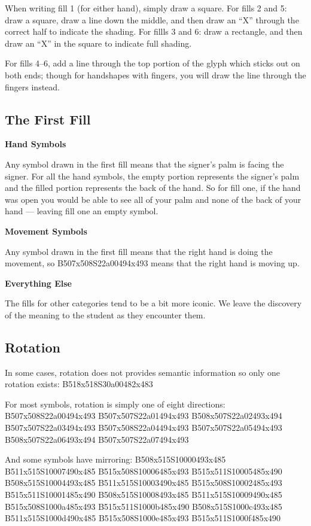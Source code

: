 \documentclass{article}
\begin{document}
When writing fill 1 (for either hand), simply draw a square.
For fills 2 and 5: draw a square, draw a line down the middle, and then draw an ``X'' through the correct half to indicate the shading.
For fillls 3 and 6: draw a rectangle, and then draw an ``X'' in the square to indicate full shading.

For fills 4--6, add a line through the top portion of the glyph which sticks out on both ends;
though for handshapes with fingers, you will draw the line through the fingers instead.

\subsection{The First Fill}

\noindent
\textbf{Hand Symbols}

Any symbol drawn in the first fill means that the signer's palm is facing the signer.
For all the hand symbols, the empty portion represents the signer's palm and the filled portion represents the back of the hand.
So for fill one, if the hand was open you would be able to see all of your palm and none of the back of your hand --- leaving fill one an empty symbol.

\noindent
\textbf{Movement Symbols}

Any symbol drawn in the first fill means that the right hand is doing the movement, so B507x508S22a00494x493 means that the right hand is moving up.

\noindent
\textbf{Everything Else}

The fills for other categories tend to be a bit more iconic.
We leave the discovery of the meaning to the student as they encounter them.

\subsection{Rotation}

In some cases, rotation does not provides semantic information so only one rotation exists:
B518x518S30a00482x483

For most symbols, rotation is simply one of eight directions:
B507x508S22a00494x493 B507x507S22a01494x493 B508x507S22a02493x494 B507x507S22a03494x493 B507x508S22a04494x493 B507x507S22a05494x493 B508x507S22a06493x494 B507x507S22a07494x493

And some symbols have mirroring:
B508x515S10000493x485 B511x515S10007490x485 B515x508S10006485x493 B515x511S10005485x490 B508x515S10004493x485 B511x515S10003490x485 B515x508S10002485x493 B515x511S10001485x490
B508x515S10008493x485 B511x515S10009490x485 B515x508S1000a485x493 B515x511S1000b485x490 B508x515S1000c493x485 B511x515S1000d490x485 B515x508S1000e485x493 B515x511S1000f485x490
\end{document}
